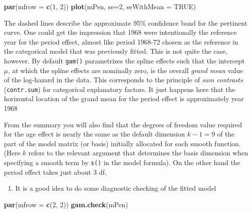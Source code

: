 \documentclass[
]{book}
\newenvironment{Shaded}{\begin{snugshade}}{\end{snugshade}}
\newcommand{\AttributeTok}[1]{\textcolor[rgb]{0.13,0.29,0.53}{#1}}
\newcommand{\ConstantTok}[1]{\textcolor[rgb]{0.56,0.35,0.01}{#1}}
\newcommand{\DecValTok}[1]{\textcolor[rgb]{0.00,0.00,0.81}{#1}}
\newcommand{\FunctionTok}[1]{\textcolor[rgb]{0.13,0.29,0.53}{\textbf{#1}}}
\newcommand{\NormalTok}[1]{#1}
\providecommand{\tightlist}{%
  \setlength{\itemsep}{0pt}\setlength{\parskip}{0pt}}
\begin{document}
\begin{Shaded}
\begin{Highlighting}[]
\FunctionTok{par}\NormalTok{(}\AttributeTok{mfrow =} \FunctionTok{c}\NormalTok{(}\DecValTok{1}\NormalTok{, }\DecValTok{2}\NormalTok{))}
\FunctionTok{plot}\NormalTok{(mPen, }\AttributeTok{se=}\DecValTok{2}\NormalTok{, }\AttributeTok{seWithMean =} \ConstantTok{TRUE}\NormalTok{)}
\end{Highlighting}
\end{Shaded}

The dashed lines describe the approximate 95\% confidence band for the
pertinent curve. One could get the impression that 1968 were
intentionally the reference year for the period effect, almost like
period 1968-72 chosen as the reference in the categorical model that was
previously fitted. This is not quite the case, however. By default
\texttt{gam()} parametrizes the spline effects such that the intercept \(\mu\),
at which the spline effects are nominally zero, is the overall \emph{grand
mean} value of the log-hazard in the data. This corresponds to the
principle of \emph{sum contrasts} (\texttt{contr.sum}) for categorical explanatory
factors. It just happens here that the horizontal location of the grand
mean for the period effect is approximately year 1968

From the summary you will also find that the degrees of freedom value
required for the age effect is nearly the same as the default dimension
\(k-1 = 9\) of the part of the model matrix (or basis) initially allocated
for each smooth function. (Here \(k\) refers to the relevant argument that
determines the basis dimension when specifying a smooth term by \texttt{s()} in
the model formula). On the other hand the period effect takes just about
3 df.

\begin{enumerate}
\def\labelenumi{\arabic{enumi}.}
\setcounter{enumi}{2}
\tightlist
\item
  It is a good idea to do some diagnostic checking of the fitted model
\end{enumerate}

\begin{Shaded}
\begin{Highlighting}[]
\FunctionTok{par}\NormalTok{(}\AttributeTok{mfrow =} \FunctionTok{c}\NormalTok{(}\DecValTok{2}\NormalTok{, }\DecValTok{2}\NormalTok{))}
\FunctionTok{gam.check}\NormalTok{(mPen)}
\end{Highlighting}
\end{Shaded}
\end{document}
